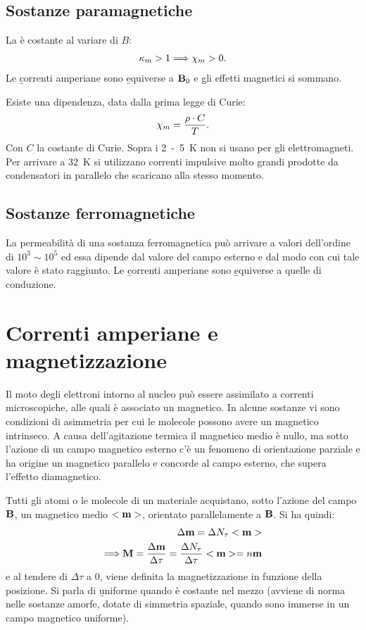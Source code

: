 \subsection{Sostanze paramagnetiche}
La \dkm è costante al variare di $B$:
\begin{equation}\begin{split}
\kappa_m>1\Longrightarrow \chi_m>0.
\end{split}\end{equation}
Le \b{correnti amperiane} sono \b{equiverse} a $\mathbf{B}_0$ e \b{gli effetti magnetici si sommano}.

Esiste una dipendenza, data dalla \b{prima legge di Curie}:
\begin{equation}\begin{split}
\chi_m=\frac{\rho\cdot C}{T}.
\end{split}\end{equation}
Con $C$ la costante di Curie. Sopra i \si{2-5 \kelvin} non si usano per gli elettromagneti. Per arrivare a \si{32 \kelvin} si utilizzano correnti impulsive molto grandi prodotte da condensatori in parallelo che scaricano alla stesso momento.

\subsection{Sostanze ferromagnetiche}
La permeabilità di una sostanza ferromagnetica può arrivare a valori dell'ordine di $10^{3}\sim10^{5}$ ed essa dipende dal valore del campo esterno e dal modo con cui tale valore è stato raggiunto. Le \b{correnti amperiane} sono \b{equiverse} a quelle di conduzione.

\section{Correnti amperiane e magnetizzazione}%
Il moto degli elettroni intorno al nucleo può essere assimilato a correnti microscopiche, alle quali è associato un \mom magnetico. In alcune sostanze vi sono condizioni di asimmetria per cui le molecole possono avere un \mom magnetico intrinseco. A causa dell'agitazione termica il \mom magnetico medio è nullo, ma sotto l'azione di un campo magnetico esterno c'è un fenomeno di orientazione parziale e ha origine un \mom magnetico parallelo e concorde al campo esterno, che supera l'effetto diamagnetico.

Tutti gli atomi o le molecole di un materiale acquistano, sotto l'azione del campo $\mathbf{B}$, un \mom magnetico medio $<\mathbf{m}>$, orientato parallelamente a $\mathbf{B}$. Si ha quindi:
\begin{equation}\begin{split}
\Delta\mathbf{m}=\Delta N_\tau<\mathbf{m}>\\
\Longrightarrow \mathbf{M}=\frac{\Delta\mathbf{m}}{\Delta\tau}=\frac{\Delta N_\tau}{\Delta\tau}<\mathbf{m}>=n\mathbf{m}
\end{split}\end{equation}
e al tendere di $\Delta\tau$ a 0, viene definita la magnetizzazione \dM in funzione della posizione. Si parla di \b{\magn uniforme} quando \dM è costante nel mezzo (avviene di norma nelle sostanze amorfe, dotate di simmetria spaziale, quando sono immerse in un campo magnetico uniforme).

